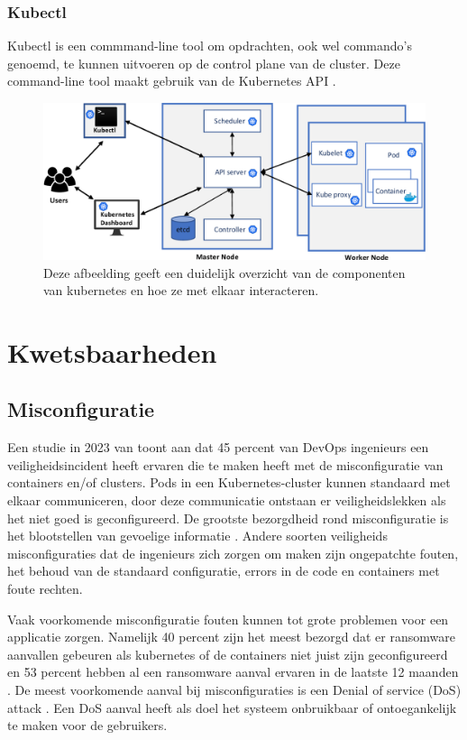 \subsubsection{Kubectl}
Kubectl is een commmand-line tool om opdrachten, ook wel commando's genoemd, te kunnen uitvoeren op de control plane van de cluster.
Deze command-line tool maakt gebruik van de Kubernetes API \autocite{KubernetesDocs-2023}.

\begin{flushleft}
    \begin{figure}[h]
        \includegraphics[width=.70\textwidth]{graphics/3-Figure1-1.png}
        \caption{\label{fig:KubernetesOverview}Deze afbeelding geeft een duidelijk overzicht van de componenten van kubernetes en hoe ze met elkaar interacteren.  \autocite{shamim2020xi}}
    \end{figure} 
\end{flushleft}


\section{Kwetsbaarheden}

\subsection{Misconfiguratie}
Een studie in 2023 van \textcite{red-hat-2023} toont aan dat 45 percent van DevOps ingenieurs een veiligheidsincident heeft ervaren die te maken heeft met de misconfiguratie van containers en/of clusters. Pods in een Kubernetes-cluster kunnen standaard met elkaar communiceren, door deze communicatie ontstaan er veiligheidslekken als het niet goed is geconfigureerd. De grootste bezorgdheid rond misconfiguratie is het blootstellen van gevoelige informatie \autocite{red-hat-2023}. Andere soorten veiligheids misconfiguraties dat de ingenieurs zich zorgen om maken zijn ongepatchte fouten, het behoud van de standaard configuratie, errors in de code en containers met foute rechten. \newline

Vaak voorkomende misconfiguratie fouten kunnen tot grote problemen voor een applicatie zorgen. Namelijk 40 percent zijn het meest bezorgd dat er ransomware aanvallen gebeuren als kubernetes of de containers niet juist zijn geconfigureerd en 53 percent hebben al een ransomware aanval ervaren in de laatste 12 maanden \autocite{red-hat-2023}. De meest voorkomende aanval bij misconfiguraties is een Denial of service (DoS) attack \autocite{red-hat-2023}. Een DoS aanval heeft als doel het systeem onbruikbaar of ontoegankelijk te maken voor de gebruikers. \newline

